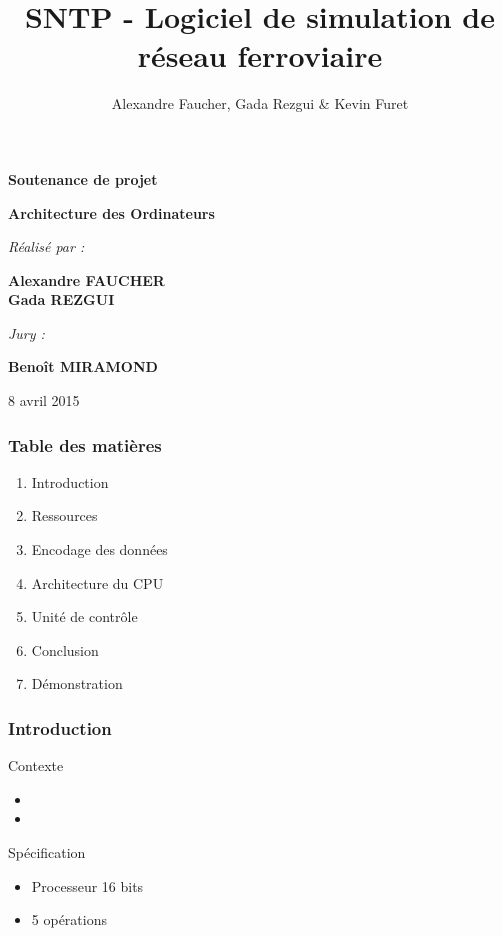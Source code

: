 \documentclass{beamer}
\title{SNTP - Logiciel de simulation de réseau ferroviaire}
\author{Alexandre Faucher, Gada Rezgui \& Kevin Furet}
\begin{document}

\begin{frame}
	\begin{center}

	{\Huge \textbf{Soutenance de projet}}

	\vspace*{0.3cm}

	{\large \textbf{Architecture des Ordinateurs}}

	\vspace*{0.5cm}

	\textit{Réalisé par :}

	{\large \textbf{Alexandre FAUCHER\\ Gada REZGUI}}

	\vspace*{0.5cm}

	\textit{Jury :}

	{\large \textbf{Benoît MIRAMOND}}

	\vspace*{0.5cm}

	{\large 8 avril 2015}

	\end{center}
\end{frame}



\begin{frame}
\frametitle{Table des matières}
\begin{enumerate}
	\item Introduction
	\item Ressources
	\item Encodage des données
	\item Architecture du CPU
	\item Unité de contrôle
	\item Conclusion
	\item Démonstration
\end{enumerate}
\end{frame}


\begin{frame}
\frametitle{Introduction}
\begin{block}{Contexte}
	\begin{itemize}
		\item 
		\item 
	\end{itemize}
\end{block}
\begin{block}{Spécification}
	\begin{itemize}
		\item Processeur 16 bits
		\item 5 opérations
	\end{itemize}
\end{block}
\end{frame}
\end{document}
